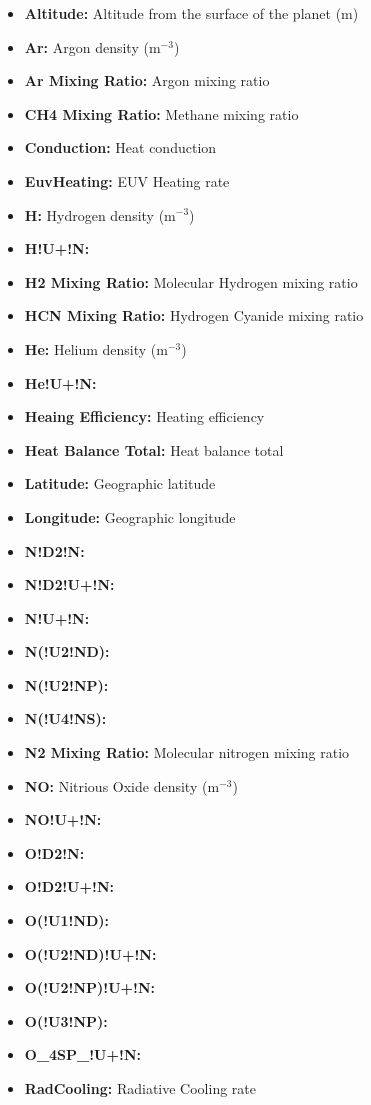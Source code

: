 \begin{itemize}
\item[]{\bf Altitude:} Altitude from the surface of the planet (m)
\item[]{\bf Ar:} Argon density (m$^{-3}$)
\item[]{\bf Ar Mixing Ratio:} Argon mixing ratio
\item[]{\bf CH4 Mixing Ratio:} Methane mixing ratio
\item[]{\bf Conduction:} Heat conduction
\item[]{\bf EuvHeating:} EUV Heating rate
\item[]{\bf H:} Hydrogen density (m$^{-3}$)
\item[]{\bf H!U+!N:} 
\item[]{\bf H2 Mixing Ratio:} Molecular Hydrogen mixing ratio
\item[]{\bf HCN Mixing Ratio:} Hydrogen Cyanide mixing ratio
\item[]{\bf He:} Helium density (m$^{-3}$)
\item[]{\bf He!U+!N:} 
\item[]{\bf Heaing Efficiency:} Heating efficiency
\item[]{\bf Heat Balance Total:} Heat balance total
\item[]{\bf Latitude:} Geographic latitude
\item[]{\bf Longitude:} Geographic longitude
\item[]{\bf N!D2!N:} 
\item[]{\bf N!D2!U+!N:} 
\item[]{\bf N!U+!N:} 
\item[]{\bf N(!U2!ND):} 
\item[]{\bf N(!U2!NP):} 
\item[]{\bf N(!U4!NS):} 
\item[]{\bf N2 Mixing Ratio:} Molecular nitrogen mixing ratio
\item[]{\bf NO:} Nitrious Oxide density (m$^{-3}$)
\item[]{\bf NO!U+!N:} 
\item[]{\bf O!D2!N:} 
\item[]{\bf O!D2!U+!N:}
\item[]{\bf O(!U1!ND):} 
\item[]{\bf O(!U2!ND)!U+!N:} 
\item[]{\bf O(!U2!NP)!U+!N:} 
\item[]{\bf O(!U3!NP):} 
\item[]{\bf O\_4SP\_!U+!N:} 
\item[]{\bf RadCooling:} Radiative Cooling rate

\end{itemize}

